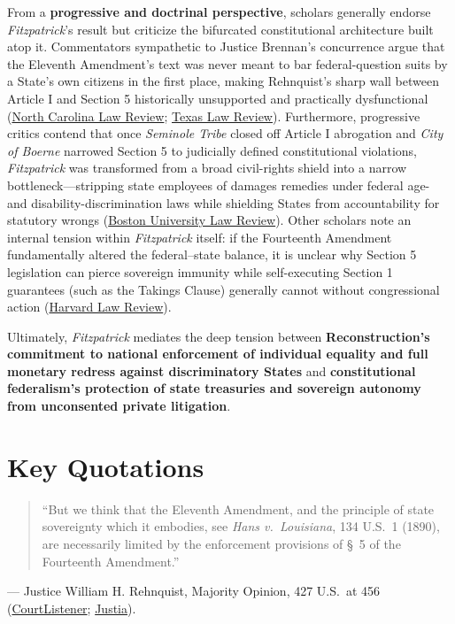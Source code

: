 \documentclass[12pt]{article}
\begin{document}
From a \textbf{progressive and doctrinal perspective}, scholars generally endorse \textit{Fitzpatrick}'s result but criticize the bifurcated constitutional architecture built atop it. Commentators sympathetic to Justice Brennan's concurrence argue that the Eleventh Amendment's text was never meant to bar federal-question suits by a State's own citizens in the first place, making Rehnquist's sharp wall between Article I and Section 5 historically unsupported and practically dysfunctional (\href{https://scholarship.law.unc.edu/cgi/viewcontent.cgi?article=1229&context=faculty_publications}{North Carolina Law Review}; \href{https://texaslawreview.org/state-sovereign-immunity-after-the-revolution/}{Texas Law Review}). Furthermore, progressive critics contend that once \textit{Seminole Tribe} closed off Article I abrogation and \textit{City of Boerne} narrowed Section 5 to judicially defined constitutional violations, \textit{Fitzpatrick} was transformed from a broad civil-rights shield into a narrow bottleneck---stripping state employees of damages remedies under federal age- and disability-discrimination laws while shielding States from accountability for statutory wrongs (\href{https://www.bu.edu/bulawreview/files/2014/08/REN.pdf}{Boston University Law Review}). Other scholars note an internal tension within \textit{Fitzpatrick} itself: if the Fourteenth Amendment fundamentally altered the federal--state balance, it is unclear why Section 5 legislation can pierce sovereign immunity while self-executing Section 1 guarantees (such as the Takings Clause) generally cannot without congressional action (\href{https://harvardlawreview.org/print/vol-129/reconciling-state-sovereign-immunity-with-the-fourteenth-amendment/}{Harvard Law Review}).

Ultimately, \textit{Fitzpatrick} mediates the deep tension between \textbf{Reconstruction's commitment to national enforcement of individual equality and full monetary redress against discriminatory States} and \textbf{constitutional federalism's protection of state treasuries and sovereign autonomy from unconsented private litigation}.

\section{Key Quotations}

\begin{quote}
``But we think that the Eleventh Amendment, and the principle of state sovereignty which it embodies, see \textit{Hans v.\ Louisiana}, 134 U.S.\ 1 (1890), are necessarily limited by the enforcement provisions of \S~5 of the Fourteenth Amendment.''
\end{quote}
\noindent --- Justice William H. Rehnquist, Majority Opinion, 427 U.S.\ at 456 (\href{https://www.courtlistener.com/opinion/109520/fitzpatrick-v-bitzer/}{CourtListener}; \href{https://supreme.justia.com/cases/federal/us/427/445/}{Justia}).
\end{document}
